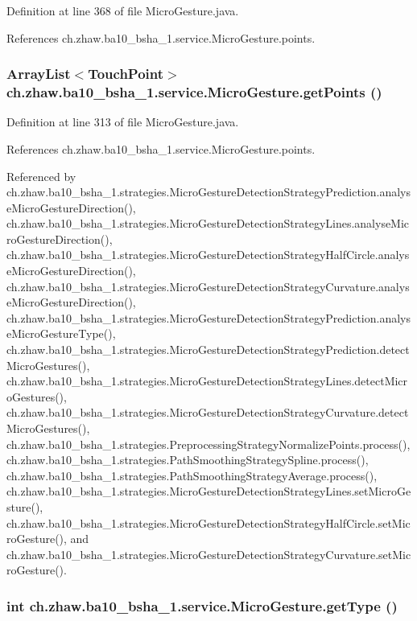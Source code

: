 Definition at line 368 of file MicroGesture.java.

References ch.zhaw.ba10\_\-bsha\_\-1.service.MicroGesture.points.\hypertarget{classch_1_1zhaw_1_1ba10__bsha__1_1_1service_1_1MicroGesture_a919d77a82938af887cff893c7b0f41e5}{
\subsubsection[{getPoints}]{\setlength{\rightskip}{0pt plus 5cm}ArrayList$<${\bf TouchPoint}$>$ ch.zhaw.ba10\_\-bsha\_\-1.service.MicroGesture.getPoints ()}}
\label{classch_1_1zhaw_1_1ba10__bsha__1_1_1service_1_1MicroGesture_a919d77a82938af887cff893c7b0f41e5}


Definition at line 313 of file MicroGesture.java.

References ch.zhaw.ba10\_\-bsha\_\-1.service.MicroGesture.points.

Referenced by ch.zhaw.ba10\_\-bsha\_\-1.strategies.MicroGestureDetectionStrategyPrediction.analyseMicroGestureDirection(), ch.zhaw.ba10\_\-bsha\_\-1.strategies.MicroGestureDetectionStrategyLines.analyseMicroGestureDirection(), ch.zhaw.ba10\_\-bsha\_\-1.strategies.MicroGestureDetectionStrategyHalfCircle.analyseMicroGestureDirection(), ch.zhaw.ba10\_\-bsha\_\-1.strategies.MicroGestureDetectionStrategyCurvature.analyseMicroGestureDirection(), ch.zhaw.ba10\_\-bsha\_\-1.strategies.MicroGestureDetectionStrategyPrediction.analyseMicroGestureType(), ch.zhaw.ba10\_\-bsha\_\-1.strategies.MicroGestureDetectionStrategyPrediction.detectMicroGestures(), ch.zhaw.ba10\_\-bsha\_\-1.strategies.MicroGestureDetectionStrategyLines.detectMicroGestures(), ch.zhaw.ba10\_\-bsha\_\-1.strategies.MicroGestureDetectionStrategyCurvature.detectMicroGestures(), ch.zhaw.ba10\_\-bsha\_\-1.strategies.PreprocessingStrategyNormalizePoints.process(), ch.zhaw.ba10\_\-bsha\_\-1.strategies.PathSmoothingStrategySpline.process(), ch.zhaw.ba10\_\-bsha\_\-1.strategies.PathSmoothingStrategyAverage.process(), ch.zhaw.ba10\_\-bsha\_\-1.strategies.MicroGestureDetectionStrategyLines.setMicroGesture(), ch.zhaw.ba10\_\-bsha\_\-1.strategies.MicroGestureDetectionStrategyHalfCircle.setMicroGesture(), and ch.zhaw.ba10\_\-bsha\_\-1.strategies.MicroGestureDetectionStrategyCurvature.setMicroGesture().\hypertarget{classch_1_1zhaw_1_1ba10__bsha__1_1_1service_1_1MicroGesture_a010dd89f21ef5ac1ed012ae1f4b7e80e}{
\subsubsection[{getType}]{\setlength{\rightskip}{0pt plus 5cm}int ch.zhaw.ba10\_\-bsha\_\-1.service.MicroGesture.getType ()}}
\label{classch_1_1zhaw_1_1ba10__bsha__1_1_1service_1_1MicroGesture_a010dd89f21ef5ac1ed012ae1f4b7e80e}


